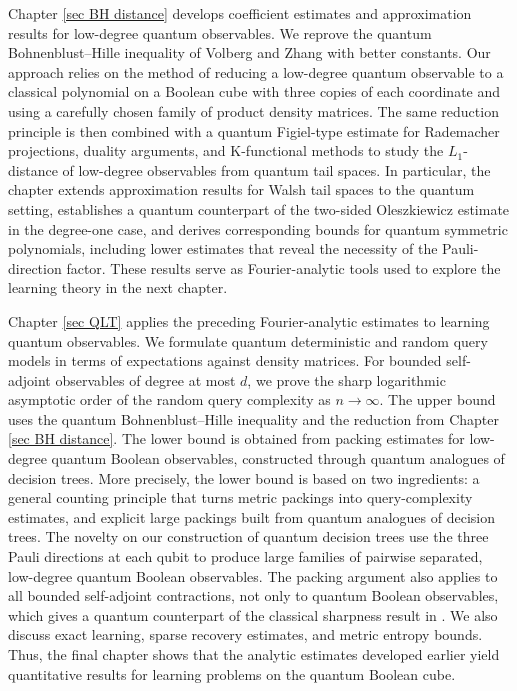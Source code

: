 \documentclass{amsbook}
\theoremstyle{definition}
\theoremstyle{remark}
\numberwithin{section}{chapter}
\numberwithin{equation}{chapter}
\newcommand{\1}{\mathbf{1}}
\begin{document}
Chapter \ref{sec BH distance} develops coefficient estimates and approximation results for low-degree quantum observables.  We reprove  the quantum Bohnenblust--Hille inequality of Volberg and Zhang \cite{V-Z2024} with better constants. Our approach relies on the method of reducing a low-degree quantum observable to a classical polynomial on a Boolean cube with three copies of each coordinate and using a carefully chosen family of product density matrices.  The same reduction principle is then combined with a quantum Figiel-type estimate for Rademacher projections, duality arguments, and K-functional methods to study the $L_{1}$-distance of low-degree observables from quantum tail spaces. In particular, the chapter extends approximation results for Walsh tail spaces to the quantum setting, establishes a quantum counterpart of the two-sided Oleszkiewicz estimate in the degree-one case, and derives corresponding bounds for quantum symmetric polynomials, including lower estimates that reveal the necessity of the Pauli-direction factor. These results serve as Fourier-analytic tools used to explore the learning theory in the next chapter.

Chapter \ref{sec QLT} applies the preceding Fourier-analytic estimates to learning quantum observables.  We formulate quantum deterministic and random query models in terms of expectations against density matrices.  For bounded self-adjoint observables of degree at most $d$, we prove the sharp logarithmic asymptotic order of the random query complexity as $n\to\infty$.  The upper bound uses the quantum Bohnenblust--Hille inequality and the reduction from Chapter \ref{sec BH distance}. The lower bound is obtained from packing estimates for low-degree quantum Boolean observables, constructed through quantum analogues of decision trees. More precisely, the lower bound is based on two ingredients: a general counting principle that turns metric packings into query-complexity estimates, and explicit large packings built from quantum analogues of decision trees. The novelty on our construction of quantum decision trees use the three Pauli directions at each qubit to produce large families of pairwise separated, low-degree quantum Boolean observables. The packing argument also applies to all bounded self-adjoint contractions, not only to quantum Boolean observables, which gives a quantum counterpart of the classical sharpness result in \cite{EIS2023}. We also discuss exact learning, sparse recovery estimates, and metric entropy bounds. Thus, the final chapter shows that the analytic estimates developed earlier yield quantitative results for learning problems on the quantum Boolean cube.
\end{document}
